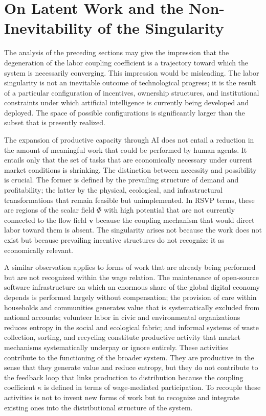 \documentclass[11pt, a4paper]{article}
\theoremstyle{plain}
\theoremstyle{definition}
\newcommand{\Phifield}{\Phi}
\newcommand{\vfield}{\mathbf{v}}
\newcommand{\coupling}{\kappa}
\begin{document}
\section*{On Latent Work and the Non-Inevitability of the Singularity}

The analysis of the preceding sections may give the impression that the
degeneration of the labor coupling coefficient is a trajectory toward which
the system is necessarily converging. This impression would be misleading.
The labor singularity is not an inevitable outcome of technological progress;
it is the result of a particular configuration of incentives, ownership
structures, and institutional constraints under which artificial intelligence
is currently being developed and deployed. The space of possible configurations
is significantly larger than the subset that is presently realized.

The expansion of productive capacity through AI does not entail a reduction
in the amount of meaningful work that could be performed by human agents. It
entails only that the set of tasks that are economically necessary under
current market conditions is shrinking. The distinction between necessity and
possibility is crucial. The former is defined by the prevailing structure of
demand and profitability; the latter by the physical, ecological, and
infrastructural transformations that remain feasible but unimplemented. In
RSVP terms, these are regions of the scalar field $\Phifield$ with high
potential that are not currently connected to the flow field $\vfield$ because
the coupling mechanism that would direct labor toward them is absent. The
singularity arises not because the work does not exist but because prevailing
incentive structures do not recognize it as economically relevant.

A similar observation applies to forms of work that are already being performed
but are not recognized within the wage relation. The maintenance of open-source
software infrastructure on which an enormous share of the global digital
economy depends is performed largely without compensation; the provision of
care within households and communities generates value that is systematically
excluded from national accounts; volunteer labor in civic and environmental
organizations reduces entropy in the social and ecological fabric; and informal
systems of waste collection, sorting, and recycling constitute productive
activity that market mechanisms systematically underpay or ignore entirely.
These activities contribute to the functioning of the broader system. They are
productive in the sense that they generate value and reduce entropy, but they
do not contribute to the feedback loop that links production to distribution
because the coupling coefficient $\coupling$ is defined in terms of wage-mediated
participation. To recouple these activities is not to invent new forms of work
but to recognize and integrate existing ones into the distributional structure
of the system.
\end{document}
